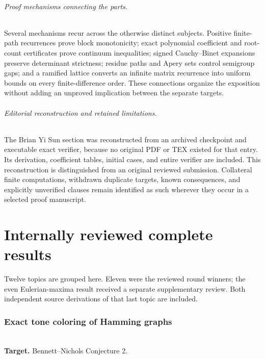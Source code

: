 \documentclass[11pt,a4paper]{article}
\begin{document}
\paragraph{Proof mechanisms connecting the parts.}
Several mechanisms recur across the otherwise distinct subjects.
Positive finite-path recurrences prove block monotonicity; exact
polynomial coefficient and root-count certificates prove continuum
inequalities; signed Cauchy--Binet expansions preserve determinant
strictness; residue paths and Apery sets control semigroup gaps;
and a ramified lattice converts an infinite matrix recurrence into
uniform bounds on every finite-difference order. These connections
organize the exposition without adding an unproved implication between
the separate targets.

\paragraph{Editorial reconstruction and retained limitations.}
The Brian Yi Sun section was reconstructed from an archived checkpoint
and executable exact verifier, because no original PDF or TEX existed
for that entry. Its derivation, coefficient tables, initial cases, and
entire verifier are included. This reconstruction is distinguished from
an original reviewed submission. Collateral finite computations,
withdrawn duplicate targets, known consequences, and explicitly
unverified clauses remain identified as such wherever they occur in a
selected proof manuscript.

\clearpage

\part{Internally reviewed complete results}

\noindent Twelve topics are grouped here. Eleven were the reviewed round winners; the even Eulerian-maxima result received a separate supplementary review. Both independent source derivations of that last topic are included.


\section{Exact tone coloring of Hamming graphs}
\label{section:R13T}
\\[3pt]
\noindent\textbf{Target.} Bennett--Nichols Conjecture 2.
\end{document}
